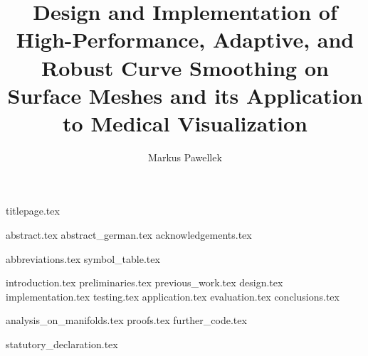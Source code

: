 \documentclass[fleqn,10pt,twoside]{stdglobal}
\title{Design and Implementation of High-Performance, Adaptive, and Robust Curve Smoothing on Surface Meshes and its Application to Medical Visualization}
\author{Markus Pawellek}
\let\oldpagenumbering\pagenumbering
\renewcommand*\pagenumbering[1]{\cleardoublepage\oldpagenumbering{#1}}
\begin{document}

  {titlepage.tex}

  {abstract.tex}
  \cleardoublepage
  {abstract_german.tex}
  {acknowledgements.tex}

  \tableofcontents
  \listoffigures
  \listoftables
  \listofmath
  {
    \small
    \listofcode
  }
  {abbreviations.tex}
  {symbol_table.tex}

  {introduction.tex}
  {preliminaries.tex}
  {previous_work.tex}
  {design.tex}
  {implementation.tex}
  {testing.tex}
  {application.tex}
  {evaluation.tex}
  {conclusions.tex}

  \nocite{*}
  \printbibheading[heading=bibintoc]
  \printbibliography[heading=subbibliography,title={Books},type=book]
  \printbibliography[heading=subbibliography,title={Online Resources},type=online]
  \printbibliography[heading=subbibliography,title={General},nottype=book,nottype=online]

  \appendix
  {analysis_on_manifolds.tex}
  {proofs.tex}
  {further_code.tex}

  {statutory_declaration.tex}
\end{document}
